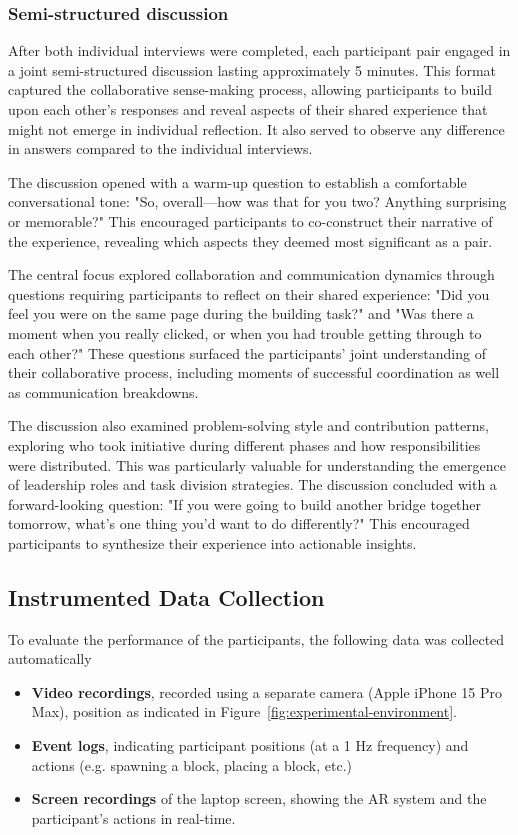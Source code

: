 \subsubsection{Semi-structured discussion}\label{subsec:semi-structured-interview}
After both individual interviews were completed, each participant pair engaged in a joint semi-structured discussion lasting approximately 5 minutes. This format captured the collaborative sense-making process, allowing participants to build upon each other's responses and reveal aspects of their shared experience that might not emerge in individual reflection. It also served to observe any difference in answers compared to the individual interviews.

The discussion opened with a warm-up question to establish a comfortable conversational tone: "So, overall—how was that for you two? Anything surprising or memorable?" This encouraged participants to co-construct their narrative of the experience, revealing which aspects they deemed most significant as a pair.

The central focus explored collaboration and communication dynamics through questions requiring participants to reflect on their shared experience: "Did you feel you were on the same page during the building task?" and "Was there a moment when you really clicked, or when you had trouble getting through to each other?" These questions surfaced the participants' joint understanding of their collaborative process, including moments of successful coordination as well as communication breakdowns.

The discussion also examined problem-solving style and contribution patterns, exploring who took initiative during different phases and how responsibilities were distributed. This was particularly valuable for understanding the emergence of leadership roles and task division strategies. The discussion concluded with a forward-looking question: "If you were going to build another bridge together tomorrow, what's one thing you'd want to do differently?" This encouraged participants to synthesize their experience into actionable insights.

\subsection{Instrumented Data Collection}\label{subsec:instrumented-data-collection}
To evaluate the performance of the participants, the following data was collected automatically
\begin{itemize}
    \item \textbf{Video recordings}\label{subsec:video-recordings}, recorded using a separate camera (Apple iPhone 15 Pro Max), position as indicated in Figure~\ref{fig:experimental-environment}.
    \item \textbf{Event logs}\label{subsec:event-logs}, indicating participant positions (at a 1 Hz frequency) and actions (e.g. spawning a block, placing a block, etc.)
    \item \textbf{Screen recordings}\label{subsec:screen-recordings} of the laptop screen, showing the AR system and the participant's actions in real-time.
\end{itemize}

